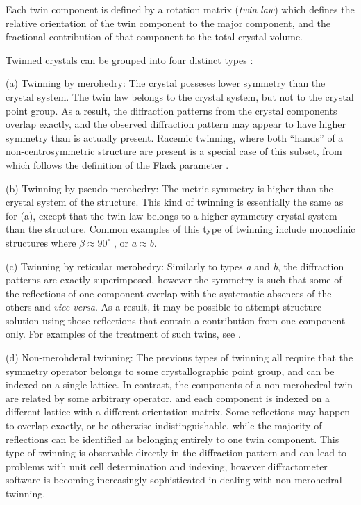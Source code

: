 \documentclass[pdf]{iucr}
\begin{document}
Each twin component is defined by a rotation matrix (\emph{twin law}) which defines the relative orientation of the twin component to the major component, and the fractional contribution of that component to the total crystal volume.

Twinned crystals can be grouped into four distinct types \cite{Herbst-Irmer:2002aa}:

(a) Twinning by merohedry: The crystal posseses lower symmetry than the crystal system. The twin law belongs to the crystal system, but not to the crystal point group. As a result, the diffraction patterns from the crystal components overlap exactly, and the observed diffraction pattern may appear to have higher symmetry than is actually present. Racemic twinning, where both ``hands'' of a non-centrosymmetric structure are present is a special case of this subset, from which follows the definition of the Flack parameter \cite{Flack:1983sp}.

(b) Twinning by pseudo-merohedry: The metric symmetry is higher than the crystal system of the structure. This kind of twinning is essentially the same as for (a), except that the twin law belongs to a higher symmetry crystal system than the structure. Common examples of this type of twinning include monoclinic structures where $ \beta \approx 90^\circ $ , or $ a \approx b $.

(c) Twinning by reticular merohedry: Similarly to types \emph{a} and \emph{b}, the diffraction patterns are exactly superimposed, however the symmetry is such that some of the reflections of one component overlap with the systematic absences of the others and \emph{vice versa}. As a result, it may be possible to attempt structure solution using those reflections that contain a contribution from one component only. For examples of the treatment of such twins, see \cite{Herbst-Irmer:2002aa}.

(d) Non-merohderal twinning: The previous types of twinning all require that the symmetry operator belongs to some crystallographic point group, and can be indexed on a single lattice. In contrast, the components of a non-merohedral twin are related by some arbitrary operator, and each component is indexed on a different lattice with a different orientation matrix. Some reflections may happen to overlap exactly, or be otherwise indistinguishable, while the majority of reflections can be identified as belonging entirely to one twin component. This type of twinning is observable directly in the diffraction pattern and can lead to problems with unit cell determination and indexing, however diffractometer software is becoming increasingly sophisticated in dealing with non-merohedral twinning.
\end{document}

